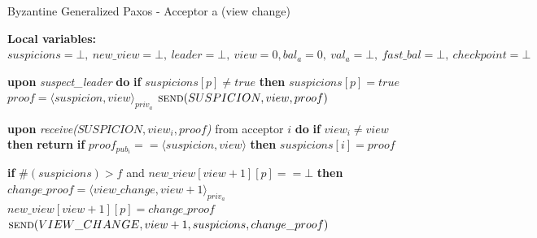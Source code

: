 \begin{algorithm} 
	\caption{Byzantine Generalized Paxos - Acceptor a (view change)}
	\label{BFT-Proc}
	\textbf{Local variables:} $suspicions = \bot,\ new\_view = \bot,\ leader = \bot,\ view = 0, bal_a = 0,\ val_a = \bot,\ fast\_bal = \bot,\ checkpoint=\bot$
	\begin{algorithmic}[1]		
		\State \textbf{upon} \textit{suspect\_leader} \textbf{do} 
		\State\hspace{\algorithmicindent} \textbf{if} $suspicions[p] \neq true$ \textbf{then}
		\State\hspace{\algorithmicindent}\hspace{\algorithmicindent} $suspicions[p] = true$
		\State\hspace{\algorithmicindent}\hspace{\algorithmicindent} $proof = \langle suspicion, view \rangle_{priv_a}$
		\State \hspace{\algorithmicindent}\hspace{\algorithmicindent} $\Call{send}{SUSPICION, view,proof}$
		\State
		
		\State \textbf{upon} \textit{receive($SUSPICION, view_i, proof$)} from acceptor $i$ \textbf{do} 
		\State\hspace{\algorithmicindent} \textbf{if} $view_i \neq view$ \textbf{then}
		\State\hspace{\algorithmicindent}\hspace{\algorithmicindent} \textbf{return}
		\State\hspace{\algorithmicindent} \textbf{if} $proof_{pub_i} == \langle suspicion, view \rangle$ \textbf{then}
		\State\hspace{\algorithmicindent}\hspace{\algorithmicindent} $suspicions[i] = proof$
		
		\State\hspace{\algorithmicindent} \textbf{if} $\#(suspicions) > f$ and $new\_view[view+1][p] == \bot$ \textbf{then}
		\State\hspace{\algorithmicindent}\hspace{\algorithmicindent} $change\_proof = \langle view\_change, view +1 \rangle_{priv_a}$
		\State\hspace{\algorithmicindent}\hspace{\algorithmicindent} $new\_view[view+1][p] = change\_proof$
		\State\hspace{\algorithmicindent}\hspace{\algorithmicindent} $\Call{send}{VIEW\_CHANGE, view+1, suspicions, change\_proof}$
		\State
		

\end{algorithmic}
\end{algorithm}
